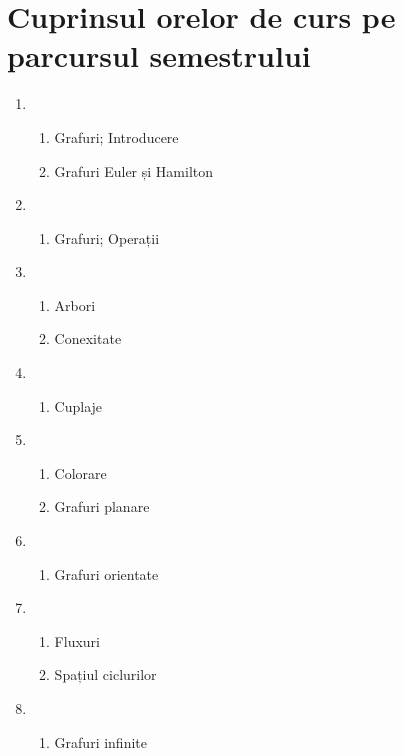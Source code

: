\section{Cuprinsul orelor de curs pe parcursul semestrului}

\begin{enumerate}[label=S\v apt\v am\^ ina \arabic*:]
  \item
    \begin{enumerate}
      \item Grafuri; Introducere
      \item Grafuri Euler și Hamilton
    \end{enumerate}
  \item
    \begin{enumerate}[resume] %
      \item Grafuri; Operații
    \end{enumerate}
  \item
    \begin{enumerate}[resume]
      \item Arbori
      \item Conexitate
    \end{enumerate}
  \item
    \begin{enumerate}[resume]
      \item Cuplaje
    \end{enumerate}
  \item
    \begin{enumerate}[resume]
      \item Colorare
      \item Grafuri planare
    \end{enumerate}
  \item
    \begin{enumerate}[resume]
      \item Grafuri orientate
    \end{enumerate}
  \item
    \begin{enumerate}[resume]
      \item Fluxuri
      \item Spațiul ciclurilor
    \end{enumerate}
  \item
    \begin{enumerate}[resume]
      \item Grafuri infinite
    \end{enumerate}
\end{enumerate}

